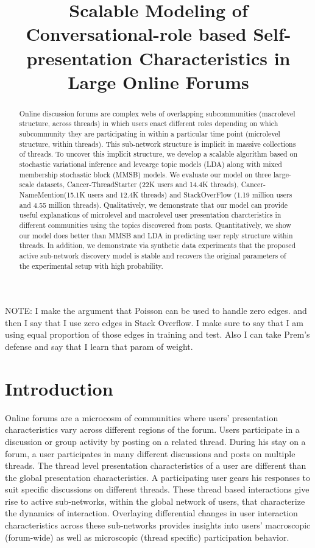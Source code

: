 \documentclass{sig-alternate}
\title{Scalable Modeling of Conversational-role based Self-presentation
Characteristics in Large Online Forums}
\begin{document}
\maketitle
\begin{abstract}

Online discussion forums are complex webs of overlapping subcommunities 
(macrolevel structure, across threads) in which users enact different roles 
depending on which subcommunity they are participating in within a particular 
time point (microlevel structure, within threads).  This sub-network structure 
is implicit in massive collections of threads. To uncover this implicit structure, 
we develop a scalable algorithm based on stochastic variational inference and 
levearge topic models (LDA) along with mixed membership stochastic block (MMSB) 
models. We evaluate our model on three large-scale datasets, Cancer-ThreadStarter (22K
users and 14.4K threads), Cancer-NameMention(15.1K users and 12.4K threads) and
StackOverFlow (1.19 million users and 4.55 million threads). Qualitatively, we
demonstrate that our model can provide useful explanations of microlevel
and macrolevel user presentation charcteristics in different communities
using the topics discovered from posts. Quantitatively, we show our model
does better than MMSB and LDA in predicting user reply structure within threads. 
In addition, we demonstrate via synthetic 
data experiments that the proposed active sub-network discovery
model is stable and recovers the original parameters of the experimental
setup with high probability.

\end{abstract}


NOTE: I make the argument that Poisson can be used to handle zero edges. and
then I say that I use zero edges in Stack Overflow. I make sure to say that I am
using equal proportion of those edges in training and test. Also I can take
Prem's defense and say that I learn that param of weight.

\section{Introduction}
Online forums are a microcosm of communities where users' presentation
characteristics vary across different regions of the forum. Users participate in
a discussion or group activity by posting on a related thread. During his
stay on a forum, a user participates in many different discussions and posts on
multiple threads. The thread level presentation characteristics of a user are different
than the global presentation characteristics. A participating user gears his
responses to suit specific discussions on different threads. These thread based
interactions give rise to active sub-networks, within the global network of users,
that characterize the dynamics of interaction. Overlaying differential changes
in user interaction characteristics across these sub-networks provides
insights into users' macroscopic (forum-wide) as well as microscopic (thread
specific) participation behavior. 
\end{document}
